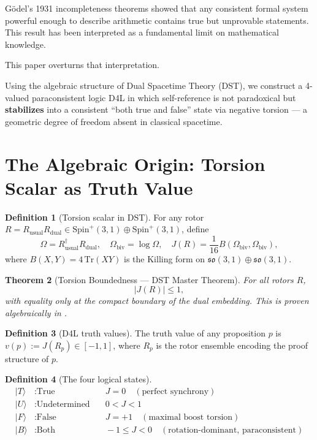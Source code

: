\documentclass[dvipdfmx,11pt,a4paper]{article}
\newtheorem{theorem}{Theorem}[section]
\theoremstyle{definition}
\newtheorem{definition}[theorem]{Definition}
\begin{document}
Gödel's 1931 incompleteness theorems showed that any consistent formal system powerful enough to describe arithmetic contains true but unprovable statements. This result has been interpreted as a fundamental limit on mathematical knowledge.

This paper overturns that interpretation.

Using the algebraic structure of Dual Spacetime Theory (DST), we construct a 4-valued paraconsistent logic D4L in which self-reference is not paradoxical but \textbf{stabilizes} into a consistent ``both true and false'' state via negative torsion — a geometric degree of freedom absent in classical spacetime.

\section{The Algebraic Origin: Torsion Scalar as Truth Value}

\begin{definition}[Torsion scalar in DST]
For any rotor $R = R_\text{usual} R_\text{dual} \in \mathrm{Spin}^+(3,1)\oplus\mathrm{Spin}^+(3,1)$, define
\[
\Omega = R_\text{usual}^\dagger R_\text{dual},\quad
\Omega_\text{biv} = \log\Omega,\quad
J(R) = \frac{1}{16} B(\Omega_\text{biv},\Omega_\text{biv}),
\]
where $B(X,Y)=4\,\mathrm{Tr}(XY)$ is the Killing form on $\mathfrak{so}(3,1)\oplus\mathfrak{so}(3,1)$.
\end{definition}

\begin{theorem}[Torsion Boundedness — DST Master Theorem]
For all rotors $R$,
\[
|J(R)| \leq 1,
\]
with equality only at the compact boundary of the dual embedding.
This is proven algebraically in \cite{DST2025}.
\end{theorem}

\begin{definition}[D4L truth values]
The truth value of any proposition $p$ is $v(p) := J(R_p) \in [-1,1]$, where $R_p$ is the rotor ensemble encoding the proof structure of $p$.
\end{definition}

\begin{definition}[The four logical states]
\begin{align*}
\vert T\rangle &: \text{True} &\quad J=0 \quad (\text{perfect synchrony}) \\
\vert U\rangle &: \text{Undetermined} &\quad 0 < J < 1 \\
\vert F\rangle &: \text{False} &\quad J = +1 \quad (\text{maximal boost torsion}) \\
\vert B\rangle &: \text{Both} &\quad -1 \leq J < 0 \quad (\text{rotation-dominant, paraconsistent})
\end{align*}
\end{definition}
\end{document}
